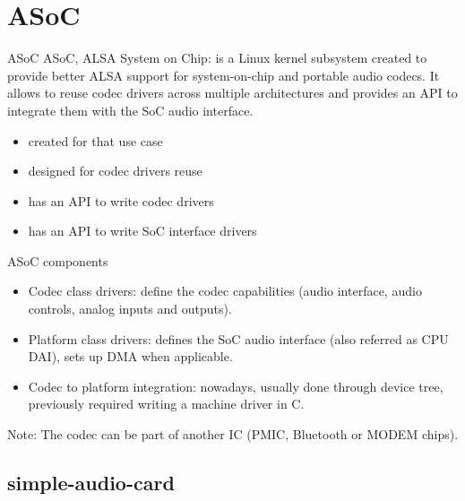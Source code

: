 \section{ASoC}

\begin{frame}{ASoC}
  ASoC, ALSA System on Chip: is a Linux kernel subsystem created to
  provide better ALSA support for system-on-chip and portable audio
  codecs. It allows to reuse codec drivers across multiple
  architectures and provides an API to integrate them with the SoC
  audio interface.
  \begin{itemize}
  \item created for that use case
  \item designed for codec drivers reuse
  \item has an API to write codec drivers
  \item has an API to write SoC interface drivers
  \end{itemize}
\end{frame}

\begin{frame}{ASoC components}
  \begin{itemize}
  \item Codec class drivers: define the codec capabilities (audio
    interface, audio controls, analog inputs and outputs).
  \item Platform class drivers: defines the SoC audio interface (also
    referred as CPU DAI), sets up DMA when applicable.
  \item Codec to platform integration: nowadays, usually done through
    device tree, previously required writing a machine driver in C.
  \end{itemize}
  Note: The codec can be part of another IC (PMIC, Bluetooth or MODEM
  chips).
\end{frame}

\subsection{simple-audio-card}


